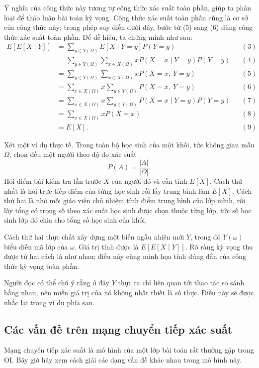 \documentclass[11pt]{article}
\begin{document}
Ý nghĩa của công thức này tương tự công thức xác suất toàn phần, giúp ta
phân loại để thảo luận bài toán kỳ vọng. Công thức xác suất toàn phần cũng
là cơ sở của công thức này; trong phép suy diễn dưới đây, bước từ (5) sang
(6) dùng công thức xác suất toàn phần. Để dễ hiểu, ta chứng minh như sau:
\[
\begin{aligned}
E[E[X\mid Y]]
  &= \sum_{y\in Y(\Omega)} E[X\mid Y=y]P(Y=y) && (3)\\
  &= \sum_{y\in Y(\Omega)}\sum_{x\in X(\Omega)}
     xP(X=x\mid Y=y)P(Y=y) && (4)\\
  &= \sum_{y\in Y(\Omega)}\sum_{x\in X(\Omega)}
     xP(X=x,\ Y=y) && (5)\\
  &= \sum_{x\in X(\Omega)}x
     \sum_{y\in Y(\Omega)}P(X=x,\ Y=y) && (6)\\
  &= \sum_{x\in X(\Omega)}x
     \sum_{y\in Y(\Omega)}P(X=x\mid Y=y)P(Y=y) && (7)\\
  &= \sum_{x\in X(\Omega)}xP(X=x) && (8)\\
  &= E[X]. && (9)
\end{aligned}
\]

Xét một ví dụ thực tế. Trong toàn bộ học sinh của một khối, tức không gian
mẫu \(\Omega\), chọn đều một người theo độ đo xác suất
\[
  P(A)=\frac{|A|}{|\Omega|}.
\]
Hỏi điểm bài kiểm tra lần trước \(X\) của người đó và cần tính \(E[X]\). Cách
thứ nhất là hỏi trực tiếp điểm của từng học sinh rồi lấy trung bình làm
\(E[X]\). Cách thứ hai là nhờ mỗi giáo viên chủ nhiệm tính điểm trung bình
của lớp mình, rồi lấy tổng có trọng số theo xác suất học sinh được chọn
thuộc từng lớp, tức số học sinh lớp đó chia cho tổng số học sinh của khối.

Cách thứ hai thực chất xây dựng một biến ngẫu nhiên mới \(Y\), trong đó
\(Y(\omega)\) biểu diễn mã lớp của \(\omega\). Giá trị tính được là
\(E[E[X\mid Y]]\). Rõ ràng kỳ vọng thu được từ hai cách là như nhau; điều này
cũng minh họa tính đúng đắn của công thức kỳ vọng toàn phần.

Người đọc có thể chú ý rằng ở đây \(Y\) thực ra chỉ liên quan tới thao tác so
sánh bằng nhau, nên miền giá trị của nó không nhất thiết là số thực. Điều này
sẽ được nhắc lại trong ví dụ phía sau.

\subsection{Các vấn đề trên mạng chuyển tiếp xác suất}

Mạng chuyển tiếp xác suất là mô hình của một lớp bài toán rất thường gặp
trong OI. Bây giờ hãy xem cách giải các dạng vấn đề khác nhau trong mô hình
này.
\end{document}
